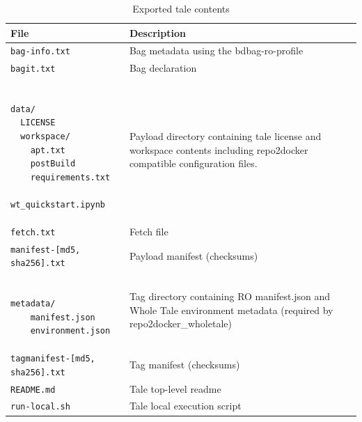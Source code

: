\documentclass[conference]{IEEEtran}
\begin{document}
\begin{table}
\begin{footnotesize}
\begin{tabular}{| p{3.5cm}|p{4.5cm} | } \hline
{\bf File} & {\bf Description}  \\ \hline
\texttt{bag-info.txt} & Bag metadata using the bdbag-ro-profile\\ \hline
\texttt{bagit.txt} & Bag declaration \\ \hline
\begin{minipage}{3in}
\begin{scriptsize}
\begin{verbatim}

data/
  LICENSE
  workspace/
    apt.txt
    postBuild
    requirements.txt
    wt_quickstart.ipynb
\end{verbatim}
\end{scriptsize}
\end{minipage} & Payload directory containing tale license and workspace contents including repo2docker compatible configuration files. \\ \hline
\texttt{\texttt{fetch.txt}} & Fetch file \\ \hline
\texttt{manifest-[md5, sha256].txt} & Payload manifest (checksums) \\ \hline
\begin{minipage}{3in}
\begin{scriptsize}
\begin{verbatim}

metadata/
    manifest.json
    environment.json
\end{verbatim}
\end{scriptsize}
\end{minipage} & Tag directory containing RO manifest.json and Whole Tale environment metadata  (required by repo2docker\_wholetale) \\ \hline
\texttt{tagmanifest-[md5, sha256].txt} & Tag manifest (checksums) \\ \hline
\texttt{README.md} & Tale top-level readme \\ \hline
\texttt{run-local.sh} & Tale local execution script \\ \hline
\end{tabular}
\end{footnotesize}
\label{bagitro-example}
\caption{Exported tale contents} \label{tab-tale-contents}
\end{table}
\end{document}
